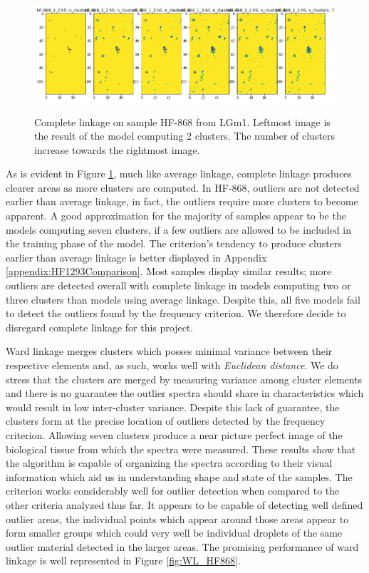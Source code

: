 \begin{figure}[H]

    \centering
{\includegraphics[width=13cm]{images/Complete_linkage/LGm-1/HF-868_1_2.h5_0.png} }
\caption{Complete linkage on sample HF-868 from LGm1. Leftmost image is the result of the model computing 2 clusters. The number of clusters increase towards the rightmost image.\label{fig:CL_HF868}}%

\end{figure}

As is evident in Figure \ref{fig:CL_HF868}, much like average linkage, complete linkage produces clearer areas as more clusters are computed. In HF-868, outliers are not detected earlier than average linkage, in fact, the outliers require more clusters to become apparent. A good approximation for the majority of samples appear to be the models computing seven clusters, if a few outliers are allowed to be included in the training phase of the model. The criterion's tendency to produce clusters earlier than average linkage is better displayed in Appendix \ref{appendix:HF1293Comparison}. Most samples display similar results; more outliers are detected overall with complete linkage in models computing two or three clusters than models using average linkage. Despite this, all five models fail to detect the outliers found by the frequency criterion. We therefore decide to disregard complete linkage for this project.

Ward linkage merges clusters which posses minimal variance between their respective elements and, as such, works well with \textit{Euclidean distance}. We do stress that the clusters are merged by measuring variance among cluster elements and there is no guarantee the outlier spectra should share in characteristics which would result in low inter-cluster variance. Despite this lack of guarantee, the clusters form at the precise location of outliers detected by the frequency criterion. Allowing seven clusters produce a near picture perfect image of the biological tissue from which the spectra were measured. These results show that the algorithm is capable of organizing the spectra according to their visual information which aid us in understanding shape and state of the samples. The criterion works considerably well for outlier detection when compared to the other criteria analyzed thus far. It appears to be capable of detecting well defined outlier areas, the individual points which appear around those areas appear to form smaller groups which could very well be individual droplets of the same outlier material detected in the larger areas. The promising performance of ward linkage is well represented in Figure \ref{fig:WL_HF868}.

